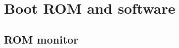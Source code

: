\documentclass[11pt,pdftex,openany,letterpaper]{report}
\begin{document}
%
%

\ifcqanalog

\clearpage
\fi




\part{Boot ROM and software}

\chapter{ROM monitor} \label{s:forth}
\end{document}
